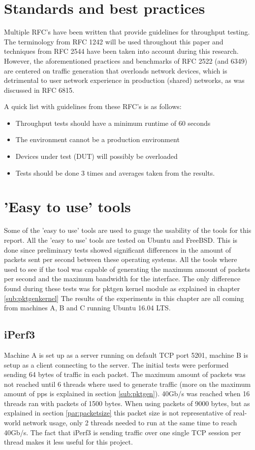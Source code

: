 \section{Standards and best practices}\label{sub:rfc}
Multiple RFC's have been written that provide guidelines for throughput testing.
The terminology from RFC 1242\cite{rfc1242} will be used throughout this paper and techniques from RFC 2544 \cite{rfc2544} have been taken into account during this research.
However, the aforementioned practices and benchmarks of RFC 2522 (and 6349\cite{rfc6349}) are centered on traffic generation that overloads network devices, which is detrimental to user network experience in production (shared) networks, as was discussed in RFC 6815\cite{rfc6815}.

A quick list with guidelines from these RFC's is as follows:

\begin{itemize}
\item{Throughput tests should have a minimum runtime of 60 seconds}
\item{The environment cannot be a production environment}
\item{Devices under test (DUT) will possibly be overloaded}
\item{Tests should be done 3 times and averages taken from the results.}
\end{itemize} 

\section{'Easy to use' tools}
Some of the 'easy to use' tools are used to guage the usability of the tools for this report. All the 'easy to use' tools are tested on Ubuntu and FreeBSD. This is done since preliminary tests showed significant differences in the amount of packets sent per second between these operating systems.
All the tools where used to see if the tool was capable of generating the maximum amount of packets per second and the maximum bandwidth for the interface.
The only difference found during these tests was for pktgen kernel module as explained in chapter \ref{sub:pktgenkernel}
The results of the experiments in this chapter are all coming from machines A, B and C running Ubuntu 16.04 LTS. 


\subsection{iPerf3}
Machine A is set up as a server running on default TCP port 5201, machine B is setup as a client connecting to the server. 
The initial tests were performed sending 64 bytes of traffic in each packet. The maximum amount of packets was not reached until 6 threads where used to generate traffic (more on the maximum amount of pps is explained in section \ref{sub:pktgen}). 40Gb/s was reached when 16 threads ran with packets of 1500 bytes. When using packets of 9000 bytes, but as explained in section \ref{par:packetsize} this packet size is not representative of real-world network usage, only 2 threads needed to run at the same time to reach 40Gb/s. The fact that iPerf3 is sending traffic over one single TCP session per thread makes it less useful for this project.

